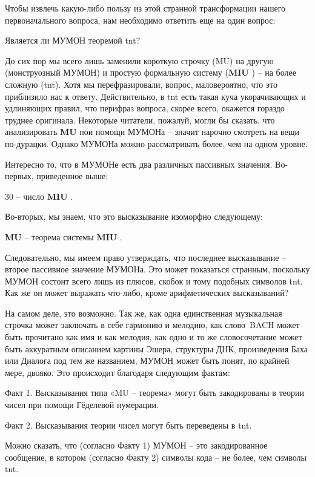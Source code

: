 \documentclass[../main.tex]{subfiles}
\begin{document}
Чтобы извлечь какую-либо пользу из этой странной трансформации нашего первоначального вопроса, нам необходимо ответить еще на один вопрос:

Является ли МУМОН теоремой \acs{tnt}?

До сих пор мы всего лишь заменили короткую строчку (MU) на другую (монструозный МУМОН) и простую формальную систему (\textbf{MIU} ) \--- на более сложную (\acs{tnt}). Хотя мы перефразировали, вопрос, маловероятно, что это приблизило нас к ответу. Действительно, в \acs{tnt} есть такая куча укорачивающих и удлиняющих правил, что перифраз вопроса, скорее всего, окажется гораздо труднее оригинала. Некоторые читатели, пожалуй, могли бы сказать, что анализировать \textbf{MU} пои помощи МУМОНа \--- значит нарочно смотреть на вещи по-дурацки. Однако МУМОНа можно рассматривать более, чем на одном уровне.

Интересно то, что в МУМОНе есть два различных пассивных значения. Во-первых, приведенное выше:

30 \--- число \textbf{MIU} .

Во-вторых, мы знаем, что это высказывание изоморфно следующему:

\textbf{MU} \--- теорема системы \textbf{MIU} .

Следовательно, мы имеем право утверждать, что последнее высказывание \--- второе пассивное значение МУМОНа. Это может показаться странным, поскольку МУМОН состоит всего лишь из плюсов, скобок и тому подобных символов \acs{tnt}\@. Как же он может выражать что-либо, кроме арифметических высказываний?

На самом деле, это возможно. Так же, как одна единственная музыкальная строчка может заключать в себе гармонию и мелодию, как слово~BACH может быть прочитано как имя и как мелодия, как одно и то же словосочетание может быть аккуратным описанием картины Эшера, структуры ДНК, произведения Баха или Диалога под тем же названием, МУМОН может быть понят, по крайней мере, двояко. Это происходит благодаря следующим фактам:

Факт 1. Высказывания типа «MU \--- теорема» могут быть закодированы в теории чисел при помощи Гёделевой нумерации.

Факт 2. Высказывания теории чисел могут быть переведены в \acs{tnt}.

Можно сказать, что (согласно Факту 1) МУМОН \--- это закодированное сообщение, в котором (согласно Факту 2) символы кода \--- не более, чем символы \acs{tnt}.
\end{document}
